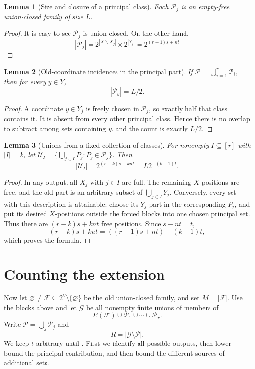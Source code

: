 \documentclass[11pt]{article}
\newtheorem{lemma}[lemma]{Lemma}
\newcommand{\Pp}{\mathcal{P}}
\newcommand{\<}{\langle}
\renewcommand{\>}{\rangle}
\newcommand{\calP}{\mathcal{P}}
\newcommand{\F}{\mathcal{F}}
\newcommand{\G}{\mathcal{G}}
\newcommand{\U}{\mathcal{U}}
\numberwithin{equation}{section}
\begin{document}
\begin{lemma}[Size and closure of a principal class]\label{lem:principal-size}
Each $\Pp_j$ is an empty-free union-closed family of size $L$.
\end{lemma}
\begin{proof}
It is easy to see $\calP_j$ is union-closed. On the other hand,
\[
|\calP_j| = 2^{|X \backslash X_j|} \times 2^{|Y_j|} = 2^{(r-1)s+nt}
\]
\end{proof}

\begin{lemma}[Old-coordinate incidences in the principal part]\label{lem:principal-degree}
If $\Pp=\bigcup_{i=1}^r\Pp_i$, then for every $y\in Y$,
\begin{equation}\label{eq:principal-degree}
 |\Pp_y|=L/2.
\end{equation}
\end{lemma}
\begin{proof}
A coordinate $y\in Y_j$ is freely chosen in $\Pp_j$, so exactly half that
class contains it. It is absent from every other principal class. Hence
there is no overlap to subtract among sets containing $y$, and the count
is exactly $L/2$.
\end{proof}

\begin{lemma}[Unions from a fixed collection of classes]\label{lem:class-unions}
For nonempty $I\subseteq[r]$ with $|I|=k$, let
$\U_I=\{\bigcup_{j\in I}P_j:P_j\in\Pp_j\}$. Then
\begin{equation}\label{eq:class-unions}
 |\U_I|=2^{(r-k)s+knt}=L2^{-(k-1)t}.
\end{equation}
\end{lemma}
\begin{proof}
In any output, all $X_j$ with $j\in I$ are full. The remaining $X$-positions
are free, and the old part is an arbitrary subset of
$\bigcup_{j\in I}Y_j$. Conversely, every set with this description is
attainable: choose its $Y_j$-part in the corresponding $P_j$, and put its
desired $X$-positions outside the forced blocks into one chosen principal
set. Thus there are $(r-k)s+knt$ free positions. Since $s-nt=t$,
\[
 (r-k)s+knt=((r-1)s+nt)-(k-1)t,
\]
which proves the formula.
\end{proof}

\section{Counting the extension}\label{sec:counting}
Now let $\varnothing\ne\F\subseteq2^V\setminus\{\varnothing\}$ be the old
union-closed family, and set $M=|\F|$. Use the blocks above and let $\G$ be
all nonempty finite unions of members of
\begin{equation}\label{eq:generators}
 E(\F)\cup\Pp_1\cup\cdots\cup\Pp_r.
\end{equation}
Write $\Pp=\bigcup_j\Pp_j$ and
\begin{equation}\label{eq:remainder}
 R=|\G\setminus\Pp|.
\end{equation}
We keep $t$ arbitrary until . First we identify
all possible outputs, then lower-bound the principal contribution, and then
bound the different sources of additional sets.
\end{document}
